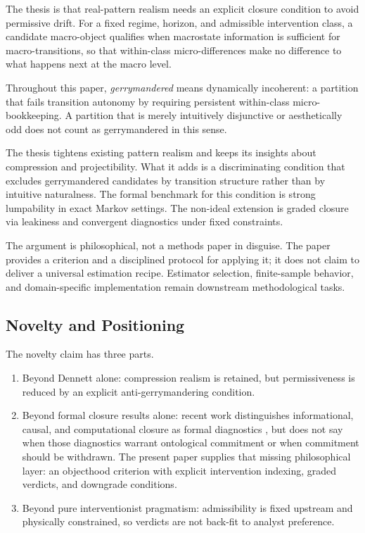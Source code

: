 The thesis is that real-pattern realism needs an explicit closure
condition to avoid permissive drift. For a fixed regime, horizon, and admissible intervention class, a
candidate macro-object qualifies when macrostate information is
sufficient for macro-transitions, so that within-class micro-differences
make no difference to what happens next at the macro level.

Throughout this paper, \emph{gerrymandered} means dynamically
incoherent: a partition that fails transition autonomy by requiring
persistent within-class micro-bookkeeping. A partition that is merely
intuitively disjunctive or aesthetically odd does not count as
gerrymandered in this sense.

The thesis tightens existing pattern realism and keeps its insights
about compression and projectibility. What it adds is a discriminating condition that excludes
gerrymandered candidates by transition structure rather than by
intuitive naturalness. The formal benchmark for this condition is strong
lumpability in exact Markov settings. The non-ideal extension is graded
closure via leakiness and convergent diagnostics under fixed
constraints.

The argument is philosophical, not a methods paper in disguise. The paper provides a criterion and a
disciplined protocol for applying it; it does not claim to deliver a
universal estimation recipe.
Estimator selection, finite-sample behavior, and domain-specific
implementation remain downstream methodological tasks.

\subsection{Novelty and Positioning}\label{novelty-and-positioning}

The novelty claim has three parts.

\begin{enumerate}
	\item
	      Beyond Dennett alone: compression realism is retained, but
	      permissiveness is reduced by an explicit anti-gerrymandering
	      condition.
	\item
	      Beyond formal closure results alone: recent work distinguishes
	      informational, causal, and computational closure as formal
	      diagnostics \citep{rosas2024}, but does not say when those
	      diagnostics warrant ontological commitment or when commitment
	      should be withdrawn. The present paper supplies that missing
	      philosophical layer: an objecthood criterion with explicit
	      intervention indexing, graded verdicts, and downgrade conditions.
	\item
	      Beyond pure interventionist pragmatism: admissibility is fixed
	      upstream and physically constrained, so verdicts are not back-fit to
	      analyst preference.
\end{enumerate}

